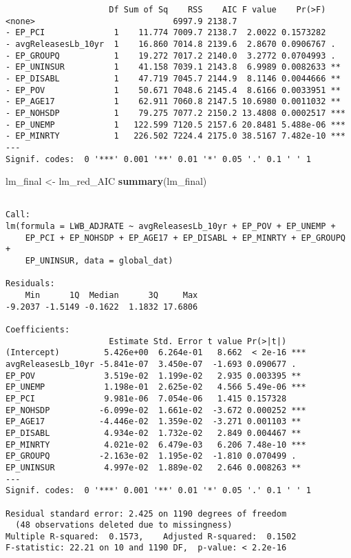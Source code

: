 \documentclass[
  12pt,
]{article}
\newenvironment{Shaded}{\begin{snugshade}}{\end{snugshade}}
\newcommand{\FunctionTok}[1]{\textcolor[rgb]{0.13,0.29,0.53}{\textbf{#1}}}
\newcommand{\NormalTok}[1]{#1}
\newcommand{\OtherTok}[1]{\textcolor[rgb]{0.56,0.35,0.01}{#1}}
\begin{document}
\begin{verbatim}
                     Df Sum of Sq    RSS    AIC F value    Pr(>F)    
<none>                            6997.9 2138.7                      
- EP_PCI              1    11.774 7009.7 2138.7  2.0022 0.1573282    
- avgReleasesLb_10yr  1    16.860 7014.8 2139.6  2.8670 0.0906767 .  
- EP_GROUPQ           1    19.272 7017.2 2140.0  3.2772 0.0704993 .  
- EP_UNINSUR          1    41.158 7039.1 2143.8  6.9989 0.0082633 ** 
- EP_DISABL           1    47.719 7045.7 2144.9  8.1146 0.0044666 ** 
- EP_POV              1    50.671 7048.6 2145.4  8.6166 0.0033951 ** 
- EP_AGE17            1    62.911 7060.8 2147.5 10.6980 0.0011032 ** 
- EP_NOHSDP           1    79.275 7077.2 2150.2 13.4808 0.0002517 ***
- EP_UNEMP            1   122.599 7120.5 2157.6 20.8481 5.488e-06 ***
- EP_MINRTY           1   226.502 7224.4 2175.0 38.5167 7.482e-10 ***
---
Signif. codes:  0 '***' 0.001 '**' 0.01 '*' 0.05 '.' 0.1 ' ' 1
\end{verbatim}

\begin{Shaded}
\begin{Highlighting}[]
\NormalTok{lm\_final }\OtherTok{\textless{}{-}}\NormalTok{ lm\_red\_AIC}
\FunctionTok{summary}\NormalTok{(lm\_final)}
\end{Highlighting}
\end{Shaded}

\begin{verbatim}

Call:
lm(formula = LWB_ADJRATE ~ avgReleasesLb_10yr + EP_POV + EP_UNEMP + 
    EP_PCI + EP_NOHSDP + EP_AGE17 + EP_DISABL + EP_MINRTY + EP_GROUPQ + 
    EP_UNINSUR, data = global_dat)

Residuals:
    Min      1Q  Median      3Q     Max 
-9.2037 -1.5149 -0.1622  1.1832 17.6806 

Coefficients:
                     Estimate Std. Error t value Pr(>|t|)    
(Intercept)         5.426e+00  6.264e-01   8.662  < 2e-16 ***
avgReleasesLb_10yr -5.841e-07  3.450e-07  -1.693 0.090677 .  
EP_POV              3.519e-02  1.199e-02   2.935 0.003395 ** 
EP_UNEMP            1.198e-01  2.625e-02   4.566 5.49e-06 ***
EP_PCI              9.981e-06  7.054e-06   1.415 0.157328    
EP_NOHSDP          -6.099e-02  1.661e-02  -3.672 0.000252 ***
EP_AGE17           -4.446e-02  1.359e-02  -3.271 0.001103 ** 
EP_DISABL           4.934e-02  1.732e-02   2.849 0.004467 ** 
EP_MINRTY           4.021e-02  6.479e-03   6.206 7.48e-10 ***
EP_GROUPQ          -2.163e-02  1.195e-02  -1.810 0.070499 .  
EP_UNINSUR          4.997e-02  1.889e-02   2.646 0.008263 ** 
---
Signif. codes:  0 '***' 0.001 '**' 0.01 '*' 0.05 '.' 0.1 ' ' 1

Residual standard error: 2.425 on 1190 degrees of freedom
  (48 observations deleted due to missingness)
Multiple R-squared:  0.1573,    Adjusted R-squared:  0.1502 
F-statistic: 22.21 on 10 and 1190 DF,  p-value: < 2.2e-16
\end{verbatim}
\end{document}
